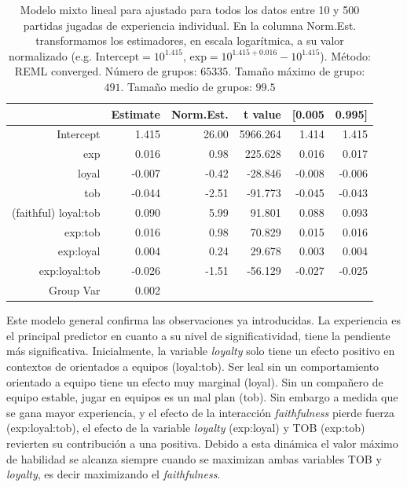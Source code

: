 \documentclass[a4paper,11pt]{book}
\theoremstyle{definition}
\begin{document}
\begin{table}[ht!]
\centering
\begin{tabular}{rrrrrr}

 & Estimate & Norm.Est. & t value  & [0.005 & 0.995] \\
  \hline
Intercept               &  1.415  &  26.00   & 5966.264  &  1.414 &  1.415 \\
exp           		&  0.016  &   0.98   &  225.628  &  0.016 &  0.017 \\
loyal         		& -0.007  &  -0.42   &  -28.846  & -0.008 & -0.006 \\
tob           		& -0.044  &  -2.51   &  -91.773  & -0.045 & -0.043 \\
(faithful) loyal:tob    &  0.090  &   5.99   &   91.801  &  0.088 &  0.093 \\
exp:tob       		&  0.016  &   0.98   &   70.829  &  0.015 &  0.016 \\
exp:loyal     		&  0.004  &   0.24   &   29.678  &  0.003 &  0.004 \\
exp:loyal:tob 		& -0.026  &  -1.51   &  -56.129  & -0.027 & -0.025 \\
Group Var     		&  0.002  &          &           &        &       \\
   \hline
\end{tabular}
\caption{
Modelo mixto lineal para ajustado para todos los datos entre 10 y 500 partidas jugadas de experiencia individual.
%
En la columna Norm.Est. transformamos los estimadores, en escala logar\'itmica, a su valor normalizado (e.g. $\text{Intercept} = 10^{1.415}$, $\text{exp} = 10^{1.415+0.016} - 10^{1.415}$).
%
M\'etodo: REML converged. N\'umero de grupos: $65335$. Tama\~no m\'aximo de grupo: $491$. Tama\~no medio de grupos: $99.5$}
\label{lmm}
\end{table}

Este modelo general confirma las observaciones ya introducidas.
%
La experiencia es el principal predictor en cuanto a su nivel de significatividad, tiene la pendiente m\'as significativa.
%
Inicialmente, la variable \emph{loyalty} solo tiene un efecto positivo en contextos de orientados a equipos (loyal:tob).
%
Ser leal sin un comportamiento orientado a equipo tiene un efecto muy marginal (loyal).
%
Sin un compa\~nero de equipo estable, jugar en equipos es un mal plan (tob).
%
Sin embargo a medida que se gana mayor experiencia, y el efecto de la interacci\'on \emph{faithfulness} pierde fuerza (exp:loyal:tob), el efecto de la variable \emph{loyalty} (exp:loyal) y TOB (exp:tob) revierten su contribuci\'on a una positiva.
%
Debido a esta din\'amica el valor m\'aximo de habilidad se alcanza siempre cuando se maximizan ambas variables TOB y \emph{loyalty}, es decir maximizando el \emph{faithfulness}.
\end{document}
